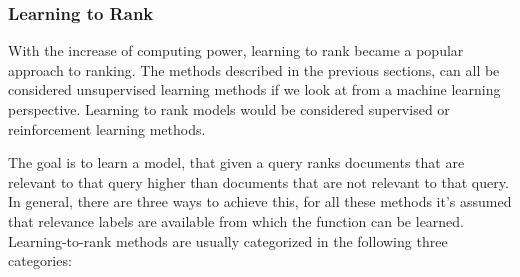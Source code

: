 \subsubsection{Learning to Rank}
With the increase of computing power, learning to rank became a popular approach to ranking. The methods described in the previous sections, can all be considered unsupervised learning methods if we look at from a machine learning perspective. Learning to rank models would be considered supervised or reinforcement learning methods. 

The goal is to learn a model, that given a query ranks documents that are relevant to that query higher than documents that are not relevant to that query. In general, there are three ways to achieve this, for all these methods it's assumed that relevance labels are available from which the function can be learned. Learning-to-rank methods are usually categorized in the following three categories: 

